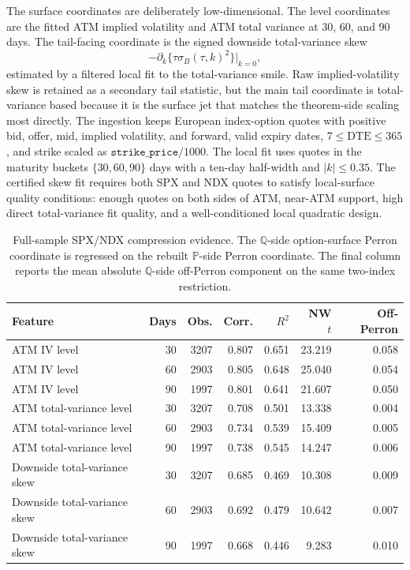 \documentclass[11pt,a4paper]{amsart}
\theoremstyle{plain}
\theoremstyle{definition}
\theoremstyle{remark}
\newcommand{\PP}{\mathbb{P}}
\newcommand{\QQ}{\mathbb{Q}}
\begin{document}
The surface coordinates are deliberately low-dimensional.  The level coordinates are the fitted ATM
implied volatility and ATM total variance at 30, 60, and 90 days.  The tail-facing coordinate is the
signed downside total-variance skew
\[
        -\partial_k\{\tau\sigma_B(\tau,k)^2\}\big|_{k=0},
\]
estimated by a filtered local fit to the total-variance smile.  Raw implied-volatility skew is
retained as a secondary tail statistic, but the main tail coordinate is total-variance based because
it is the surface jet that matches the theorem-side scaling most directly.  The ingestion keeps
European index-option quotes with positive bid, offer, mid, implied volatility, and forward, valid
expiry dates, \(7\le \mathrm{DTE}\le365\), and strike scaled as \(\texttt{strike\_price}/1000\).
The local fit uses quotes in the maturity buckets \(\{30,60,90\}\) days with a ten-day half-width
and \(|k|\le0.35\).  The certified skew fit requires both SPX and NDX quotes to satisfy local-surface
quality conditions: enough quotes on both sides of ATM, near-ATM support, high direct total-variance
fit quality, and a well-conditioned local quadratic design.

\begin{table}[t]
\centering
\footnotesize
\begin{tabular}{lrrrrrr}
\hline
Feature & Days & Obs. & Corr. & \(R^2\) & NW \(t\) & Off-Perron \\
\hline
ATM IV level & 30 & 3207 & 0.807 & 0.651 & 23.219 & 0.058 \\
ATM IV level & 60 & 2903 & 0.805 & 0.648 & 25.040 & 0.054 \\
ATM IV level & 90 & 1997 & 0.801 & 0.641 & 21.607 & 0.050 \\
ATM total-variance level & 30 & 3207 & 0.708 & 0.501 & 13.338 & 0.004 \\
ATM total-variance level & 60 & 2903 & 0.734 & 0.539 & 15.409 & 0.005 \\
ATM total-variance level & 90 & 1997 & 0.738 & 0.545 & 14.247 & 0.006 \\
Downside total-variance skew & 30 & 3207 & 0.685 & 0.469 & 10.308 & 0.009 \\
Downside total-variance skew & 60 & 2903 & 0.692 & 0.479 & 10.642 & 0.007 \\
Downside total-variance skew & 90 & 1997 & 0.668 & 0.446 & 9.283 & 0.010 \\
\hline
\end{tabular}
\caption{Full-sample SPX/NDX compression evidence.  The \(\QQ\)-side option-surface Perron
coordinate is regressed on the rebuilt \(\PP\)-side Perron coordinate.  The final column
reports the mean absolute \(\QQ\)-side off-Perron component on the same two-index restriction.}
\label{tab:empirical-main-compression}
\end{table}
\end{document}
